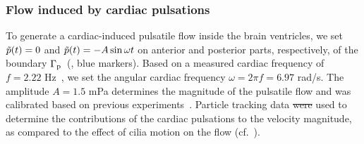 \documentclass{WileyMSP-template}
\providecommand{\DIFadd}[1]{{\protect\color{blue}\uwave{#1}}} %
\providecommand{\DIFdel}[1]{{\protect\color{red}\sout{#1}}} %
\providecommand{\DIFaddbegin}{} %
\providecommand{\DIFaddend}{} %
\providecommand{\DIFdelbegin}{} %
\providecommand{\DIFdelend}{} %
\begin{document}
\subsubsection{Flow induced by cardiac pulsations}
To generate a cardiac-induced pulsatile flow inside the brain ventricles, we set $\Tilde{p}(t)=0$ and
$\Tilde{p}(t)=-A\sin{\omega t}$ on anterior and posterior parts, respectively, of the
boundary $\Gamma_{\mathrm{p}}$~(, blue markers).
Based on a measured cardiac frequency of $f=2.22$ Hz~\cite{Olstad2019CiliaryDevelopment},
we set the angular cardiac frequency $\omega=2\pi f=6.97$ rad/s. The amplitude $A=1.5$ mPa determines the magnitude of the pulsatile flow
and was calibrated based on previous experiments~\cite{Olstad2019CiliaryDevelopment}.
Particle tracking data \DIFdelbegin \DIFdel{were }\DIFdelend \DIFaddbegin \DIFadd{was }\DIFaddend used to determine the contributions of the
cardiac pulsations to the velocity magnitude,
as compared to the effect of cilia motion on the flow (cf.~).
\end{document}
